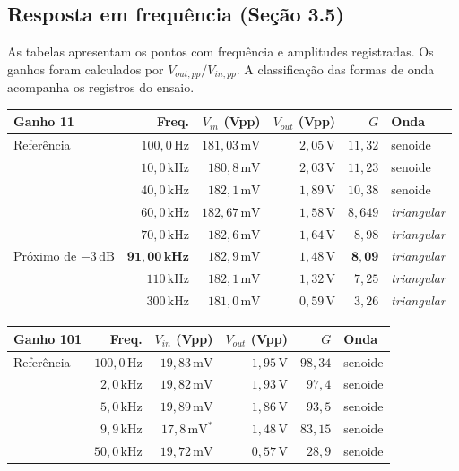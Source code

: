 \documentclass[11pt,a4paper]{article}
\begin{document}
\subsection{Resposta em frequência (Seção 3.5)}
\label{sec:freq-bancada}

As tabelas apresentam os pontos com frequência e amplitudes registradas. Os ganhos
foram calculados por \(V_{out,pp}/V_{in,pp}\). A classificação das formas de onda
acompanha os registros do ensaio.

\begin{center}\small
\setlength{\tabcolsep}{4pt}
\begin{tabular}{@{}lrrrrl@{}}
\toprule
\textbf{Ganho 11} & \textbf{Freq.} & \(V_{in}\) (Vpp) & \(V_{out}\) (Vpp) & \(G\) & \textbf{Onda} \\
\midrule
Referência & \(100{,}0\,\text{Hz}\) & \(181{,}03\,\text{mV}\) & \(2{,}05\,\text{V}\) & \(11{,}32\) & senoide \\
& \(10{,}0\,\text{kHz}\) & \(180{,}8\,\text{mV}\) & \(2{,}03\,\text{V}\) & \(11{,}23\) & senoide \\
& \(40{,}0\,\text{kHz}\) & \(182{,}1\,\text{mV}\) & \(1{,}89\,\text{V}\) & \(10{,}38\) & senoide \\
& \(60{,}0\,\text{kHz}\) & \(182{,}67\,\text{mV}\) & \(1{,}58\,\text{V}\) & \(8{,}649\) & \emph{triangular} \\
& \(70{,}0\,\text{kHz}\) & \(182{,}6\,\text{mV}\) & \(1{,}64\,\text{V}\) & \(8{,}98\) & \emph{triangular} \\
Próximo de \(-3\,\text{dB}\) & \(\mathbf{91{,}00\,\text{kHz}}\) & \(182{,}9\,\text{mV}\) & \(1{,}48\,\text{V}\) & \(\mathbf{8{,}09}\) & \emph{triangular} \\
& \(110\,\text{kHz}\) & \(182{,}1\,\text{mV}\) & \(1{,}32\,\text{V}\) & \(7{,}25\) & \emph{triangular} \\
& \(300\,\text{kHz}\) & \(181{,}0\,\text{mV}\) & \(0{,}59\,\text{V}\) & \(3{,}26\) & \emph{triangular} \\
\bottomrule
\end{tabular}
\end{center}

\begin{center}\small
\setlength{\tabcolsep}{4pt}
\begin{tabular}{@{}lrrrrl@{}}
\toprule
\textbf{Ganho 101} & \textbf{Freq.} & \(V_{in}\) (Vpp) & \(V_{out}\) (Vpp) & \(G\) & \textbf{Onda} \\
\midrule
Referência & \(100{,}0\,\text{Hz}\) & \(19{,}83\,\text{mV}\) & \(1{,}95\,\text{V}\) & \(98{,}34\) & senoide \\
& \(2{,}0\,\text{kHz}\) & \(19{,}82\,\text{mV}\) & \(1{,}93\,\text{V}\) & \(97{,}4\) & senoide \\
& \(5{,}0\,\text{kHz}\) & \(19{,}89\,\text{mV}\) & \(1{,}86\,\text{V}\) & \(93{,}5\) & senoide \\
& \(9{,}9\,\text{kHz}\) & \(17{,}8\,\text{mV}^{*}\) & \(1{,}48\,\text{V}\) & \(83{,}15\) & senoide \\
& \(50{,}0\,\text{kHz}\) & \(19{,}72\,\text{mV}\) & \(0{,}57\,\text{V}\) & \(28{,}9\) & senoide \\
\bottomrule
\end{tabular}
\end{center}
\end{document}
